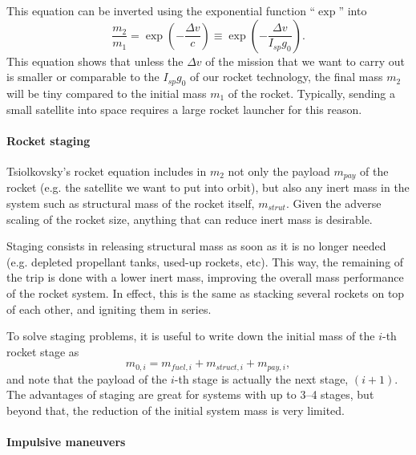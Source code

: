 This equation can be inverted using the exponential function ``$\exp$'' into
%
\begin{equation}
\frac{m_2}{m_1} = \exp\left(-\frac{\Delta v}{c}\right) 
\equiv \exp\left(-\frac{\Delta v}{I_{sp} g_0}\right).
\end{equation}
%
This equation shows that unless the $\Delta v$ of the mission that we want to
carry out is smaller or comparable to the $I_{sp}g_0$ of our rocket technology,
the final mass $m_2$ will be tiny compared to the initial mass 
$m_1$ of the rocket. Typically, sending a small satellite into space requires
a large rocket launcher for this reason.

\paragraph{Rocket staging}

Tsiolkovsky's rocket equation includes in $m_2$ not only the payload $m_{pay}$
of the  rocket (e.g. the satellite we want to put into orbit), but also any
inert mass in the system such as structural mass of the rocket itself,
$m_{strut}$. Given the adverse scaling of the rocket size, anything that can
reduce inert mass is desirable.

Staging consists in releasing structural mass as soon as it is no longer 
needed (e.g. depleted propellant tanks, used-up rockets, etc). This way, the 
remaining of the trip is done with a lower inert mass, improving the overall
mass performance of the rocket system. In effect, this is the same as
stacking several rockets on top of each other, and igniting them in series.

To solve staging problems, it is useful to write down the initial mass of 
the $i$-th rocket stage as
%
\begin{equation}
m_{0,i} = m_{fuel,i} + m_{struct,i} + m_{pay,i},
\end{equation}
%
and note that the payload of the $i$-th stage is actually the next stage, 
$(i+1)$. The advantages of staging are great for systems with up to 3--4 
stages, but beyond that, the reduction of the initial system mass is very 
limited.

\paragraph{Impulsive maneuvers}

